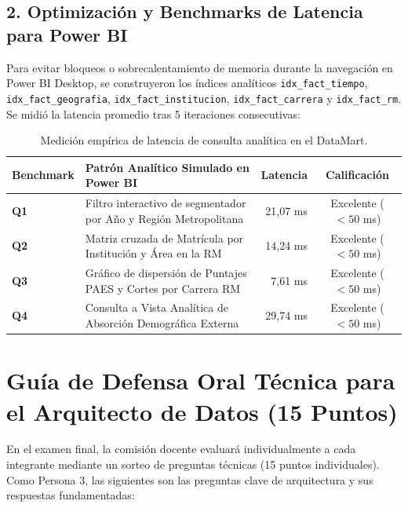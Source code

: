 \documentclass[11pt,a4paper]{article}
\begin{document}
\subsection{2. Optimización y Benchmarks de Latencia para Power BI}
Para evitar bloqueos o sobrecalentamiento de memoria durante la navegación en Power BI Desktop, se construyeron los índices analíticos \texttt{idx\_fact\_tiempo}, \texttt{idx\_fact\_geografia}, \texttt{idx\_fact\_institucion}, \texttt{idx\_fact\_carrera} y \texttt{idx\_fact\_rm}. Se midió la latencia promedio tras 5 iteraciones consecutivas:

\begin{table}[h!]
\centering
\small
\begin{tabular}{|l|p{7.5cm}|r|c|}
\hline
\textbf{Benchmark} & \textbf{Patrón Analítico Simulado en Power BI} & \textbf{Latencia} & \textbf{Calificación} \\
\hline
\textbf{Q1} & Filtro interactivo de segmentador por Año y Región Metropolitana & 21,07 ms & Excelente ($<50$ ms) \\
\textbf{Q2} & Matriz cruzada de Matrícula por Institución y Área en la RM & 14,24 ms & Excelente ($<50$ ms) \\
\textbf{Q3} & Gráfico de dispersión de Puntajes PAES y Cortes por Carrera RM & 7,61 ms & Excelente ($<50$ ms) \\
\textbf{Q4} & Consulta a Vista Analítica de Absorción Demográfica Externa & 29,74 ms & Excelente ($<50$ ms) \\
\hline
\end{tabular}
\caption{Medición empírica de latencia de consulta analítica en el DataMart.}
\label{tab:benchmarks}
\end{table}

\section{Guía de Defensa Oral Técnica para el Arquitecto de Datos (15 Puntos)}
\label{sec:defensa}

En el examen final, la comisión docente evaluará individualmente a cada integrante mediante un sorteo de preguntas técnicas (15 puntos individuales). Como Persona 3, las siguientes son las preguntas clave de arquitectura y sus respuestas fundamentadas:
\end{document}
